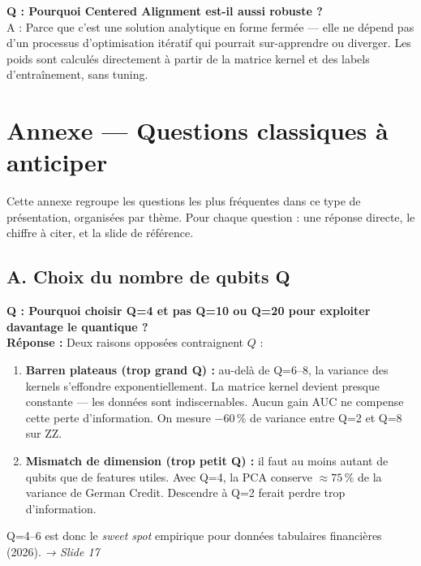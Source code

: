 \documentclass[12pt, a4paper]{article}
\begin{document}
\begin{question}
\textbf{Q : Pourquoi Centered Alignment est-il aussi robuste ?}\\
A : Parce que c'est une solution analytique en forme fermée — elle ne dépend pas
d'un processus d'optimisation itératif qui pourrait sur-apprendre ou diverger.
Les poids sont calculés directement à partir de la matrice kernel
et des labels d'entraînement, sans tuning.
\end{question}

\section*{Annexe — Questions classiques à anticiper}

Cette annexe regroupe les questions les plus fréquentes dans ce type de présentation,
organisées par thème. Pour chaque question : une réponse directe, le chiffre à citer,
et la slide de référence.

\subsection*{A. Choix du nombre de qubits Q}

\begin{question}
\textbf{Q : Pourquoi choisir Q=4 et pas Q=10 ou Q=20 pour exploiter davantage le quantique ?}\\[4pt]
\textbf{Réponse :} Deux raisons opposées contraignent $Q$ :
\begin{enumerate}
  \item \textbf{Barren plateaus (trop grand Q) :} au-delà de Q=6--8, la variance des kernels
        s'effondre exponentiellement. La matrice kernel devient presque constante —
        les données sont indiscernables. Aucun gain AUC ne compense cette perte d'information.
        On mesure $-60\,\%$ de variance entre Q=2 et Q=8 sur ZZ.
  \item \textbf{Mismatch de dimension (trop petit Q) :} il faut au moins autant de qubits
        que de features utiles. Avec Q=4, la PCA conserve $\approx 75\,\%$ de la variance
        de German Credit. Descendre à Q=2 ferait perdre trop d'information.
\end{enumerate}
Q=4--6 est donc le \emph{sweet spot} empirique pour données tabulaires financières (2026).
\hfill\textit{→ Slide 17}
\end{question}
\end{document}
